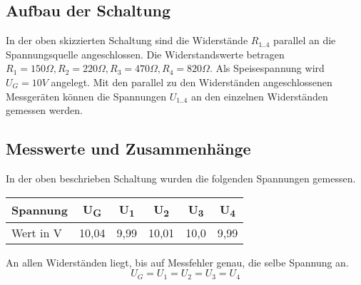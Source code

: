 \documentclass[
a4paper,     %
 headsepline, %
11pt         %
]{scrartcl}  %
\begin{document}
\begin{center}
\end{center}

\subsection{Aufbau der Schaltung}

In der oben skizzierten Schaltung sind die Widerstände $R_{1..4}$ parallel an die Spannungsquelle angeschlossen. 
Die Widerstandswerte betragen $ R_1 = 150 \Omega, R_2 = 220 \Omega, R_3=470 \Omega, R_4=820 \Omega$. 
Als Speisespannung wird $ U_G = 10V$ angelegt. 
Mit den parallel zu den Widerständen angeschlossenen Messgeräten können die Spannungen $U_{1..4}$ an den einzelnen Widerständen gemessen werden.

\subsection{Messwerte und Zusammenhänge}
In der oben beschrieben Schaltung wurden die folgenden Spannungen gemessen.
\begin{center}
  \begin{tabular}{ l | c | c | c | c | c}
    \hline
    Spannung   & U\textsubscript{G} & U\textsubscript{1} & U\textsubscript{2} & U\textsubscript{3} & U\textsubscript{4}  \\ \hline
    Wert in V  & 10,04 & 9,99 & 10,01 & 10,0 & 9,99 \\
    \hline
  \end{tabular}
\end{center}
An allen Widerständen liegt, bis auf Messfehler genau, die selbe Spannung an.
\[U_G=U_1=U_2=U_3=U_4\]
\end{document}
